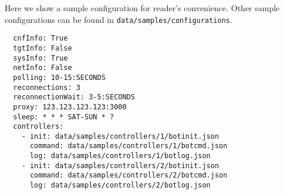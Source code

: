 Here we show a sample configuration for reader's convenience. Other sample configurations can be found in \texttt{data/samples/configurations}.

\begin{verbatim}
  cnfInfo: True
  tgtInfo: False
  sysInfo: True
  netInfo: False
  polling: 10-15:SECONDS
  reconnections: 3
  reconnectionWait: 3-5:SECONDS
  proxy: 123.123.123.123:3000
  sleep: * * * SAT-SUN * ?
  controllers:
    - init: data/samples/controllers/1/botinit.json
      command: data/samples/controllers/1/botcmd.json
      log: data/samples/controllers/1/botlog.json
    - init: data/samples/controllers/2/botinit.json
      command: data/samples/controllers/2/botcmd.json
      log: data/samples/controllers/2/botlog.json
\end{verbatim}
